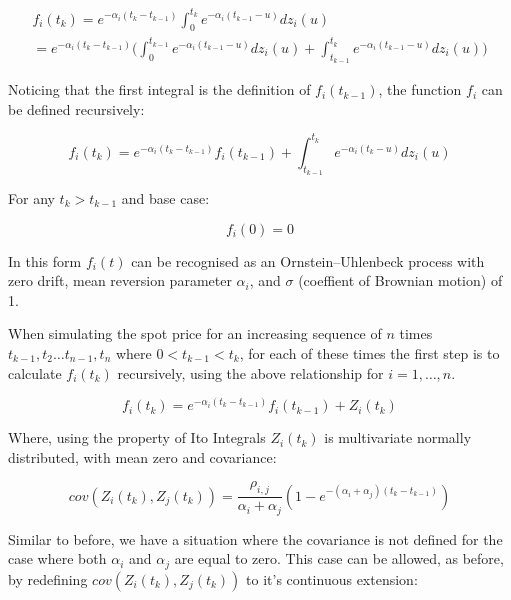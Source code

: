 \documentclass{article}
\begin{document}
\begin{eqnarray}
    \nonumber
    f_i(t_k) = e^{-\alpha_i(t_k - t_{k-1})} \int_0^{t_k} e^{-\alpha_i(t_{k-1}-u)} dz_i(u) \\
        = e^{-\alpha_i(t_k - t_{k-1})} \biggl(\int_0^{t_{k-1}} e^{-\alpha_i(t_{k-1}-u)} dz_i(u) +
        \int_{t_{k-1}}^{t_k} e^{-\alpha_i(t_{k-1}-u)} dz_i(u) \biggr)
\end{eqnarray}

Noticing that the first integral is the definition of $f_i(t_{k-1})$, the function $f_i$ can
be defined recursively:

\begin{equation}
    f_i(t_k) = e^{-\alpha_i(t_k - t_{k-1})}f_i(t_{k-1}) + \int_{t_{k-1}}^{t_k} e^{-\alpha_i(t_k-u)} dz_i(u)
\end{equation}

For any $t_k > t_{k-1}$ and base case:

\begin{equation}
    f_i(0) = 0
\end{equation}

In this form $f_i(t)$ can be recognised as an Ornstein–Uhlenbeck process with zero drift,
mean reversion parameter $\alpha_i$, and $\sigma$ (coeffient of Brownian motion) of 1.

\bigskip

When simulating the spot price for an increasing sequence of $n$
times $t_{k-1}, t_2 \hdots t_{n-1}, t_n$ where $0 < t_{k-1} < t_k$, for each of these
times the first step is to calculate $f_i(t_k)$ recursively, using the above relationship %
for $i = 1, \hdots, n$.

\begin{equation}
    f_i(t_k) = e^{-\alpha_i(t_k - t_{k-1})}f_i(t_{k-1}) + Z_i(t_k)
\end{equation}

Where, using the property of Ito Integrals $Z_i(t_k)$ is multivariate normally 
distributed, with mean zero and covariance:

\begin{equation}
    cov(Z_i(t_k), Z_j(t_k)) = \frac{\rho_{i, j}}{\alpha_i + \alpha_j}(1 - 
    e^{-(\alpha_i + \alpha_j)(t_k - t_{k-1})})
\end{equation}

Similar to before, we have a situation where the covariance is not defined for the case
where both $\alpha_i$ and $\alpha_j$ are equal to zero. This case can be allowed, as
before, by redefining $cov(Z_i(t_k), Z_j(t_k))$ to it's continuous extension:
\end{document}
